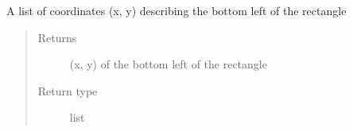 \documentclass[letterpaper,10pt,english]{sphinxmanual}
\begin{document}
\begin{fulllineitems}
\begin{fulllineitems}
\end{fulllineitems}


\begin{fulllineitems}
\label{\detokenize{source/pyzones:pyzones.Rectangle.xy}}
A list of coordinates (x, y) describing the bottom left of the rectangle
\begin{quote}\begin{description}
\item[{Returns}] \leavevmode
(x, y) of the bottom left of the rectangle

\item[{Return type}] \leavevmode
list

\end{description}\end{quote}

\end{fulllineitems}


\end{fulllineitems}

\end{document}
